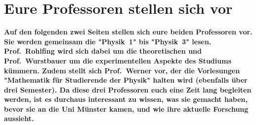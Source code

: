 \section[Eure Profs stellen sich vor]{Eure Professoren stellen sich vor}
\textbf{Auf den folgenden zwei Seiten stellen sich eure beiden Professoren vor.
    Sie werden gemeinsam die "Physik~1" bis "Physik~3" lesen.
    Prof.\ Rohlfing wird sich dabei um die theoretischen und Prof.\ Wurstbauer um die experimentellen Aspekte des Studiums kümmern.
    Zudem stellt sich Prof.\ Werner vor, der die Vorlesungen "Mathematik für Studierende der Physik" halten wird (ebenfalls über drei Semester).
	Da diese drei Professoren euch eine Zeit lang begleiten werden, ist es durchaus interessant zu wissen, was sie gemacht haben, bevor sie an die Uni Münster kamen, und wie ihre aktuelle Forschung aussieht.}

